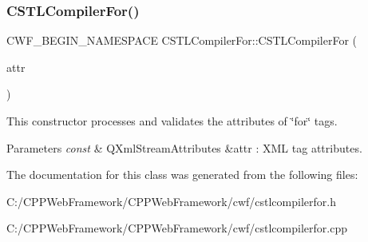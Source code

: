 \subsubsection{\texorpdfstring{C\+S\+T\+L\+Compiler\+For()}{CSTLCompilerFor()}}
{\footnotesize\ttfamily C\+W\+F\+\_\+\+B\+E\+G\+I\+N\+\_\+\+N\+A\+M\+E\+S\+P\+A\+CE C\+S\+T\+L\+Compiler\+For\+::\+C\+S\+T\+L\+Compiler\+For (\begin{DoxyParamCaption}\item[{const Q\+Xml\+Stream\+Attributes \&}]{attr }\end{DoxyParamCaption})\hspace{0.3cm}{\ttfamily [explicit]}}



This constructor processes and validates the attributes of \char`\"{}for\char`\"{} tags. 


\begin{DoxyParams}{Parameters}
{\em const} & Q\+Xml\+Stream\+Attributes \&attr \+: X\+ML tag attributes. \\
\hline
\end{DoxyParams}


The documentation for this class was generated from the following files\+:\begin{DoxyCompactItemize}
\item 
C\+:/\+C\+P\+P\+Web\+Framework/\+C\+P\+P\+Web\+Framework/cwf/cstlcompilerfor.\+h\item 
C\+:/\+C\+P\+P\+Web\+Framework/\+C\+P\+P\+Web\+Framework/cwf/cstlcompilerfor.\+cpp\end{DoxyCompactItemize}

